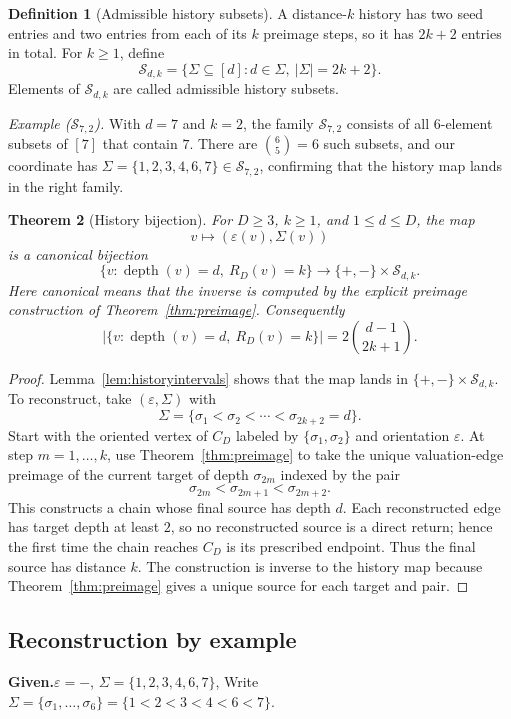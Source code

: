 \documentclass[11pt]{amsart}
\newtheorem{theorem}{Theorem}[section]
\theoremstyle{definition}
\newtheorem{definition}[theorem]{Definition}
\theoremstyle{remark}
\newcommand{\depth}{\operatorname{depth}}
\newcommand{\Sfam}{\mathcal S}
\newcommand{\eps}{\varepsilon}
\begin{document}
\begin{definition}[Admissible history subsets]\label{def:Sfam}
A distance-$k$ history has two seed entries and two entries from each
of its \(k\) preimage steps, so it has \(2k+2\) entries in total.  For
\(k\ge1\), define
\[
\Sfam_{d,k}
=
\{\Sigma\subseteq[d]:d\in\Sigma,\ |\Sigma|=2k+2\}.
\]
Elements of \(\Sfam_{d,k}\) are called admissible history subsets.
\end{definition}

\begin{examplebox}
\textit{Example ($\Sfam_{7,2}$).}
With $d=7$ and $k=2$, the family $\Sfam_{7,2}$ consists of all
$6$-element subsets of $[7]$ that contain $7$.  There are
$\binom{6}{5}=6$ such subsets, and our coordinate has
$\Sigma=\{1,2,3,4,6,7\}\in\Sfam_{7,2}$, confirming that the history
map lands in the right family.
\end{examplebox}

\begin{theorem}[History bijection]\label{thm:bijection}
For $D\ge3$, $k\ge1$, and $1\le d\le D$, the map
\[
v\longmapsto (\eps(v),\Sigma(v))
\]
is a canonical bijection
\[
\{v:\depth(v)=d,\ R_D(v)=k\}
\longrightarrow
\{+,-\}\times\Sfam_{d,k}.
\]
Here canonical means that the inverse is computed by the explicit
preimage construction of Theorem~\ref{thm:preimage}.  Consequently
\[
\bigl|\{v:\depth(v)=d,\ R_D(v)=k\}\bigr|=2\binom{d-1}{2k+1}.
\]
\end{theorem}
\begin{proof}
Lemma~\ref{lem:historyintervals} shows that the map lands in
$\{+,-\}\times\Sfam_{d,k}$.
To reconstruct, take $(\eps,\Sigma)$ with
\[
\Sigma=\{\sigma_1<\sigma_2<\cdots<\sigma_{2k+2}=d\}.
\]
Start with the oriented vertex of $C_D$ labeled by
$\{\sigma_1,\sigma_2\}$ and orientation $\eps$.  At step
$m=1,\ldots,k$, use Theorem~\ref{thm:preimage} to take the unique
valuation-edge preimage of the current target of depth $\sigma_{2m}$
indexed by the pair
\[
\sigma_{2m}<\sigma_{2m+1}<\sigma_{2m+2}.
\]
This constructs a chain whose final source has depth $d$.
Each reconstructed edge has target depth at least $2$, so no
reconstructed source is a direct return; hence the first time the
chain reaches $C_D$ is its prescribed endpoint.  Thus the final source
has distance $k$.  The construction is inverse to the history map
because Theorem~\ref{thm:preimage} gives a unique source for each
target and pair.
\end{proof}

\subsection{Reconstruction by example}\hfill \break
\textbf{Given.}\enspace $\eps=-$, $\Sigma=\{1,2,3,4,6,7\}$,
Write $\Sigma=\{\sigma_1,\ldots,\sigma_6\}=\{1<2<3<4<6<7\}$.
\end{document}
